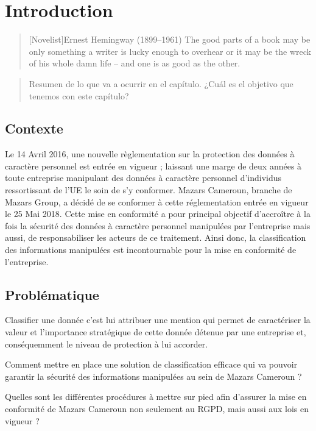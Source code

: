 \chapter{Introduction}

\begin{quotation}[Novelist]{Ernest Hemingway (1899--1961)}
The good parts of a book may be only something a writer is lucky enough to overhear or it may be the wreck of his whole damn life -- and one is as good as the other.
\end{quotation}

\begin{abstract}
Resumen de lo que va a ocurrir en el capítulo. ¿Cuál es el objetivo que tenemos con este capítulo?
\end{abstract}

\section{Contexte}

Le 14 Avril 2016, une nouvelle règlementation sur la protection des données à caractère personnel est entrée en vigueur ; laissant une marge de deux années à toute entreprise manipulant des données à caractère personnel d’individus ressortissant de l’UE le soin de s’y conformer. Mazars Cameroun, branche de Mazars Group, a décidé de se conformer à cette réglementation entrée en vigueur le 25 Mai 2018. Cette mise en conformité a pour principal objectif d’accroître à la fois la sécurité des données à caractère personnel manipulées par l’entreprise mais aussi, de responsabiliser les acteurs de ce traitement. Ainsi donc, la classification des informations manipulées est incontournable pour la mise en conformité de l’entreprise. 

\section{Problématique}

Classifier une donnée c’est lui attribuer une mention qui permet de caractériser la valeur et l’importance stratégique de cette donnée détenue par une entreprise et, conséquemment le niveau de protection à lui accorder.

Comment mettre en place une solution de classification efficace qui va pouvoir garantir la sécurité des informations manipulées au sein de Mazars Cameroun ? 

Quelles sont les différentes procédures à mettre sur pied afin d’assurer la mise en conformité de Mazars Cameroun non seulement au RGPD, mais aussi aux lois en vigueur ?


